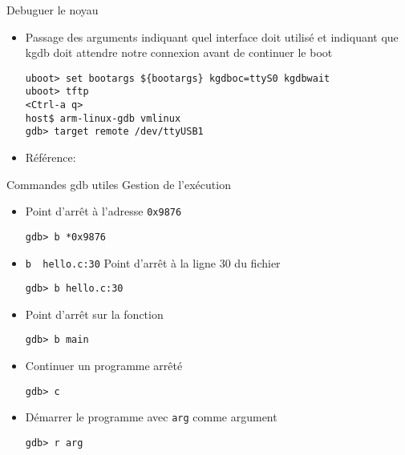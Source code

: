 \begin{frame}[fragile=singleslide]{Debuguer le noyau}
  \begin{itemize}
  \item  Passage des arguments   indiquant  quel interface
     doit utilisé et   indiquant que kgdb doit
    attendre notre connexion avant de continuer le boot
    \begin{lstlisting}
uboot> set bootargs ${bootargs} kgdboc=ttyS0 kgdbwait
uboot> tftp
<Ctrl-a q>
host$ arm-linux-gdb vmlinux 
gdb> target remote /dev/ttyUSB1
    \end{lstlisting} 
    \item Référence: 
  \end{itemize}
\end{frame}



\begin{frame}[fragile=singleslide]{Commandes gdb utiles}
  Gestion de l'exécution
  \begin{itemize}
  \item Point d'arrêt à l'adresse \verb+0x9876+
    \begin{lstlisting}
gdb> b *0x9876
    \end{lstlisting}
  \item \verb+b  hello.c:30+ Point  d'arrêt à la  ligne 30  du fichier
    \begin{lstlisting}
gdb> b hello.c:30
    \end{lstlisting}
  \item Point d'arrêt sur la fonction 
    \begin{lstlisting}
gdb> b main
    \end{lstlisting}
  \item Continuer un programme arrêté
    \begin{lstlisting}
gdb> c
    \end{lstlisting}
  \item Démarrer le programme avec \verb+arg+ comme argument
    \begin{lstlisting}
gdb> r arg
    \end{lstlisting}
  \end{itemize}
\end{frame}
  
